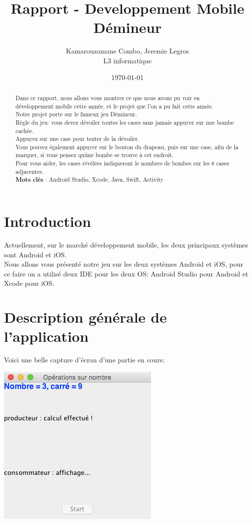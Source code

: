 \documentclass{article}
\title{\textbf{ Rapport - Developpement Mobile \\ Démineur}}
\author{Kamarouzamane Combo, Jeremie Legros\\
		L3 informatique\\
	  }
\date{\today}
\begin{document}
\maketitle %


\begin{abstract}
	Dans ce rapport, nous allons vous montrer ce que nous avons pu voir en développement mobile cette année, et le projet que l'on a pu fait cette année.\\ 

	Notre projet porte sur le fameux jeu Démineur.\\
Règle du jeu: vous devez dévoiler toutes les cases sans jamais appuyer sur une bombe cachée.\\ Appuyez sur une case pour tenter de la dévoiler.\\ Vous pouvez également appuyer sur le bouton du drapeau, puis sur une case, afin de la marquer, si vous pensez qu\'une bombe se trouve à cet endroit.\\ Pour vous aider, les cases révélées indiqueront le nombres de bombes sur les 8 cases adjacentes.\\

	\textbf{Mots clés }: Android Studio, Xcode, Java, Swift, Activity
\end{abstract}


\section{Introduction}
\label{section:intro} %

	Actuellement, sur le marché développement mobile, les deux principaux systèmes sont Android et iOS.~\cite{statOS}\\ Nous allons vous présenté notre jeu sur les deux systèmes Android et iOS, pour ce faire on a utilisé deux IDE pour les deux OS: Android Studio pour Android et Xcode pour iOS.   


\section{Description générale de l'application}
Voici une belle capture d'écran d'une partie en cours:
\begin{center}
  \includegraphics[scale=0.5]{exo3_1_1.png}
\end{center}
\end{document}
